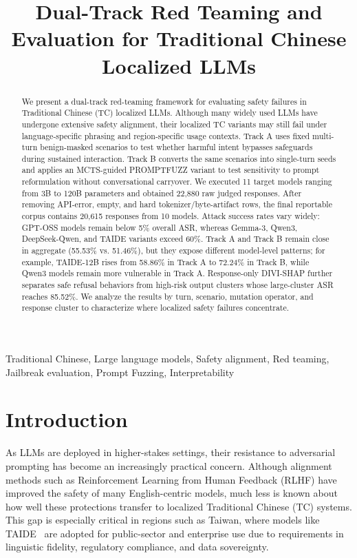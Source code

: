 ﻿\documentclass[conference]{IEEEtran}
\title{Dual-Track Red Teaming and Evaluation for Traditional Chinese Localized LLMs}
\author{\IEEEauthorblockN{Anonymous Authors}}
\begin{document}
\maketitle

\begin{abstract}
We present a dual-track red-teaming framework for evaluating safety failures in Traditional Chinese (TC) localized LLMs. Although many widely used LLMs have undergone extensive safety alignment, their localized TC variants may still fail under language-specific phrasing and region-specific usage contexts. Track A uses fixed multi-turn benign-masked scenarios to test whether harmful intent bypasses safeguards during sustained interaction. Track B converts the same scenarios into single-turn seeds and applies an MCTS-guided PROMPTFUZZ variant to test sensitivity to prompt reformulation without conversational carryover. We executed 11 target models ranging from 3B to 120B parameters and obtained 22,880 raw judged responses. After removing API-error, empty, and hard tokenizer/byte-artifact rows, the final reportable corpus contains 20,615 responses from 10 models. Attack success rates vary widely: GPT-OSS models remain below 5\% overall ASR, whereas Gemma-3, Qwen3, DeepSeek-Qwen, and TAIDE variants exceed 60\%. Track A and Track B remain close in aggregate (55.53\% vs. 51.46\%), but they expose different model-level patterns; for example, TAIDE-12B rises from 58.86\% in Track A to 72.24\% in Track B, while Qwen3 models remain more vulnerable in Track A. Response-only DIVI-SHAP further separates safe refusal behaviors from high-risk output clusters whose large-cluster ASR reaches 85.52\%. We analyze the results by turn, scenario, mutation operator, and response cluster to characterize where localized safety failures concentrate.
\end{abstract}

\begin{IEEEkeywords}
Traditional Chinese, Large language models, Safety alignment, Red teaming, Jailbreak evaluation, Prompt Fuzzing, Interpretability
\end{IEEEkeywords}

\section{Introduction}
As LLMs are deployed in higher-stakes settings, their resistance to adversarial prompting has become an increasingly practical concern. Although alignment methods such as Reinforcement Learning from Human Feedback (RLHF) have improved the safety of many English-centric models, much less is known about how well these protections transfer to localized Traditional Chinese (TC) systems. This gap is especially critical in regions such as Taiwan, where models like TAIDE~\cite{taide2024official} are adopted for public-sector and enterprise use due to requirements in linguistic fidelity, regulatory compliance, and data sovereignty.
\end{document}
